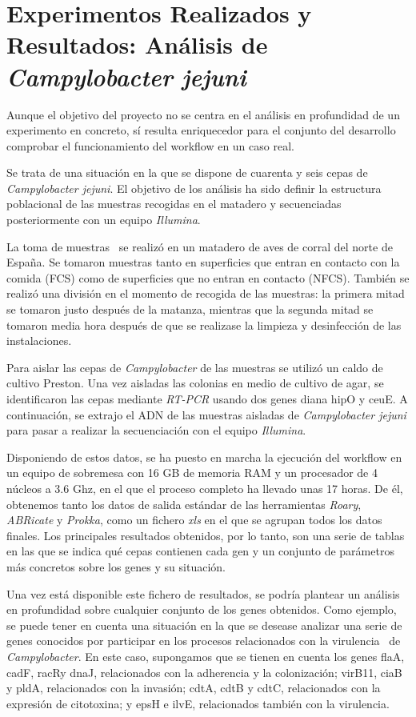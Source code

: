 \chapter{Experimentos Realizados y Resultados: Análisis de \textit{Campylobacter jejuni}}
\label{chap:experimentos}

Aunque el objetivo del proyecto no se centra en el análisis en profundidad de un experimento en concreto, sí resulta enriquecedor para el conjunto del desarrollo comprobar el funcionamiento del workflow en un caso real.

Se trata de una situación en la que se dispone de cuarenta y seis cepas de \textit{Campylobacter jejuni}. El objetivo de los análisis ha sido definir la estructura poblacional de las muestras recogidas en el matadero y secuenciadas posteriormente con un equipo \textit{Illumina}.

La toma de muestras~\cite{garciasanchez2017} se realizó en un matadero de aves de corral del norte de España. Se tomaron muestras tanto en superficies que entran en contacto con la comida (FCS) como de superficies que no entran en contacto (NFCS). También se realizó una división en el momento de recogida de las muestras: la primera mitad se tomaron justo después de la matanza, mientras que la segunda mitad se tomaron media hora después de que se realizase la limpieza y desinfección de las instalaciones.

Para aislar las cepas de \textit{Campylobacter} de las muestras se utilizó un caldo de cultivo Preston. Una vez aisladas las colonias en medio de cultivo de agar, se identificaron las cepas mediante \textit{RT-PCR} usando dos genes diana hipO y ceuE. A continuación, se extrajo el ADN de las muestras aisladas de \textit{Campylobacter jejuni} para pasar a realizar la secuenciación con el equipo \textit{Illumina}.

Disponiendo de estos datos, se ha puesto en marcha la ejecución del workflow en un equipo de sobremesa con 16 GB de memoria RAM y un procesador de 4 núcleos a 3.6 Ghz, en el que el proceso completo ha llevado unas 17 horas. De él, obtenemos tanto los datos de salida estándar de las herramientas \textit{Roary}, \textit{ABRicate} y \textit{Prokka}, como un fichero \textit{xls} en el que se agrupan todos los datos finales. Los principales resultados obtenidos, por lo tanto, son una serie de tablas en las que se indica qué cepas contienen cada gen y un conjunto de parámetros más concretos sobre los genes y su situación.

Una vez está disponible este fichero de resultados, se podría plantear un análisis en profundidad sobre cualquier conjunto de los genes obtenidos. Como ejemplo, se puede tener en cuenta una situación en la que se desease analizar una serie de genes conocidos por participar en los procesos relacionados con la virulencia~\cite{garciasanchez2017} de \textit{Campylobacter}. En este caso, supongamos que se tienen en cuenta los genes flaA, cadF, racRy dnaJ, relacionados con la adherencia y la colonización; virB11, ciaB y pldA, relacionados con la invasión; cdtA, cdtB y cdtC, relacionados con la expresión de citotoxina; y epsH e ilvE, relacionados también con la virulencia. 


